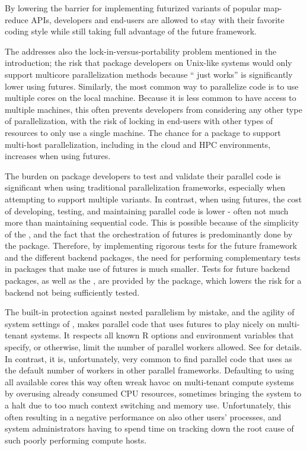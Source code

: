 By lowering the barrier for implementing futurized variants of popular
map-reduce APIs, developers and end-users are allowed to stay with
their favorite coding style while still taking full advantage of the
future framework.

The  addresses also the lock-in-versus-portability
problem mentioned in the introduction; the risk that package
developers on Unix-like systems would only support multicore
parallelization methods because `` just works'' is
significantly lower using futures.  Similarly, the most common way to
parallelize code is to use multiple cores on the local machine.
Because it is less common to have access to multiple machines, this
often prevents developers from considering any other type of
parallelization, with the risk of locking in end-users with other
types of resources to only use a single machine.  The chance for a
package to support multi-host parallelization, including in the cloud
and HPC environments, increases when using futures.

The burden on package developers to test and validate their parallel
code is significant when using traditional parallelization frameworks,
especially when attempting to support multiple variants.  In contrast,
when using futures, the cost of developing, testing, and maintaining
parallel code is lower - often not much more than maintaining
sequential code.  This is possible because of the simplicity of the
, and the fact that the orchestration of futures is
predominantly done by the  package.  Therefore, by
implementing rigorous tests for the future framework and the different
backend packages, the need for performing complementary tests in
packages that make use of futures is much smaller.  Tests for future
backend packages, as well as the , are provided by
the  package, which lowers the risk for a backend
not being sufficiently tested.

The built-in protection against nested parallelism by mistake, and the
agility of system settings of , makes parallel
code that uses futures to play nicely on multi-tenant systems.  It
respects all known R options and environment variables that specify,
or otherwise, limit the number of parallel workers allowed.
See  for
details.  In contrast, it is, unfortunately, very common to find
parallel code that uses  as the default
number of workers in other parallel frameworks.  Defaulting to using
all available cores this way often wreak havoc on multi-tenant compute
systems by overusing already consumed CPU resources, sometimes
bringing the system to a halt due to too much context switching and
memory use.  Unfortunately, this often resulting in a negative
performance on also other users' processes, and system administrators
having to spend time on tracking down the root cause of such poorly
performing compute hosts.


